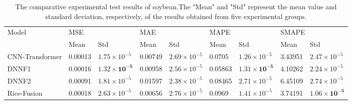 \documentclass[acmsmall,manuscript, screen, review]{acmart}
\begin{document}
\begin{table}[htbp]
  \centering
  \caption{The comparative experimental test results of soybean.The "Mean" and "Std" represent the mean value and standard deviation, respectively, of the results obtained from five experimental groups.}
    \begin{tabular}{lllllllll}
    \toprule
    \multicolumn{1}{l}{\multirow{2}[4]{*}{Model}} & \multicolumn{2}{l}{MSE} & \multicolumn{2}{l}{MAE} & \multicolumn{2}{l}{MAPE} & \multicolumn{2}{l}{SMAPE} \\
\cmidrule{2-9}          & Mean  & Std   & Mean  & Std   & Mean  & Std   & Mean  & Std \\
    \midrule
    CNN-Transformer & 0.00013 & \begin{math}1.75\times 10^{-5}\end{math} & 0.00749 & \begin{math}2.69\times 10^{-5}\end{math} & 0.0705 & \begin{math}1.26\times 10^{-5}\end{math} & 3.43951 & \begin{math}2.47\times 10^{-5}\end{math} \\
    DNNF1 & 0.00016 & \begin{math}\mathbf{1.32\times 10^{-5}}\end{math} & 0.00958 & \begin{math}2.56\times 10^{-5}\end{math} & 0.05863 & \begin{math}\mathbf{1.31\times 10^{-5}}\end{math} & 4.10262 & \begin{math}2.24\times 10^{-5}\end{math} \\
    DNNF2 & 0.00091 & \begin{math}1.81\times 10^{-5}\end{math} & 0.01597 & \begin{math}2.38\times 10^{-5}\end{math} & 0.08465 & \begin{math}2.71\times 10^{-5}\end{math} & 6.45109 & \begin{math}2.74\times 10^{-5}\end{math} \\
    Rice-Fusion & 0.00018 & \begin{math}2.63\times 10^{-5}\end{math} & 0.00656 & \begin{math}2.76\times 10^{-5}\end{math} & 0.0969 & \begin{math}1.41\times 10^{-5}\end{math} & 3.74191 & \begin{math}\mathbf{1.06\times 10^{-5}}\end{math} \\

\end{tabular}
\end{table}
\end{document}
